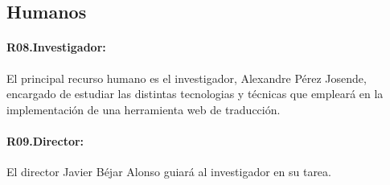 \subsection{Humanos}
\paragraph{R08.\quad Investigador:}\label{R08}
El principal recurso humano es el investigador, Alexandre Pérez Josende,
encargado de estudiar las distintas tecnologias y técnicas que empleará en la
implementación de una herramienta web de traducción.

\paragraph{R09.\quad Director:}\label{R09}
El director Javier Béjar Alonso guiará al investigador en su tarea.

